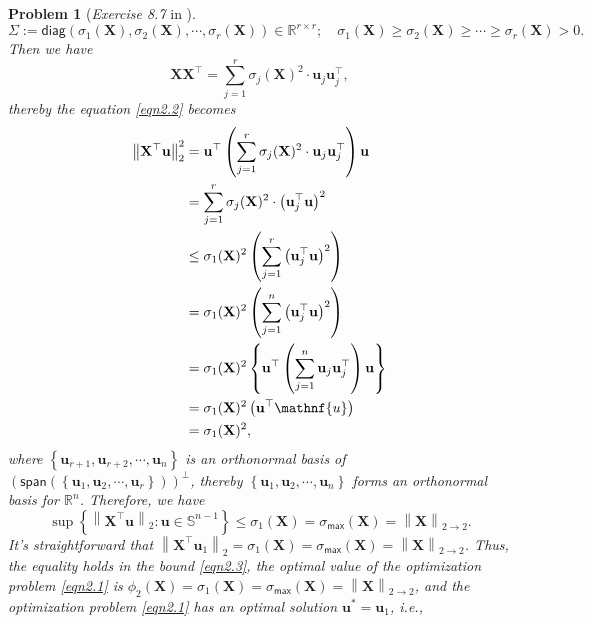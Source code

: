 \documentclass[11pt]{article}
\newtheorem{problem}{Problem}
\numberwithin{equation}{problem}
\begin{document}
\begin{problem} [\emph{Exercise 8.7} in \cite{calafiore2014optimization}]
{\begin{equation*}
    \Sigma := \textsf{diag} \left( \sigma_1 (\mathbf{X}), \sigma_2 (\mathbf{X}), \cdots, \sigma_r (\mathbf{X}) \right) \in \mathbb{R}^{r \times r}; \quad \sigma_1 (\mathbf{X}) \geq \sigma_2 (\mathbf{X}) \geq \cdots \geq \sigma_r (\mathbf{X}) > 0.
\end{equation*}
Then we have
\begin{equation*}
    \mathbf{X} \mathbf{X}^{\top} =
    \sum_{j=1}^{r} \sigma_j (\mathbf{X})^2 \cdot \mathbf{u}_j \mathbf{u}_{j}^{\top},
\end{equation*}
thereby the equation \eqref{eqn2.2} becomes
\begin{equation*}
    \begin{split}
        \left\| \mathbf{X}^{\top} \mathbf{u} \right\|_{2}^2 &= \mathbf{u}^{\top} \left( \sum_{j=1}^{r} \sigma_j (\mathbf{X})^2 \cdot \mathbf{u}_j \mathbf{u}_{j}^{\top} \right) \mathbf{u} \\
        &= \sum_{j=1}^{r} \sigma_j (\mathbf{X})^2 \cdot \left( \mathbf{u}_{j}^{\top} \mathbf{u} \right)^2 \\
        &\leq \sigma_{1}(\mathbf{X})^2 \left( \sum_{j=1}^{r} \left( \mathbf{u}_{j}^{\top} \mathbf{u} \right)^2 \right) \\
        &= \sigma_{1}(\mathbf{X})^2 \left( \sum_{j=1}^{n} \left( \mathbf{u}_{j}^{\top} \mathbf{u} \right)^2 \right) \\
        &= \sigma_{1}(\mathbf{X})^2 \left\{ \mathbf{u}^{\top} \left( \sum_{j=1}^{n} \mathbf{u}_j \mathbf{u}_{j}^{\top} \right) \mathbf{u} \right\} \\
        &= \sigma_{1}(\mathbf{X})^2 \left( \mathbf{u}^{\top} \mathnf{u} \right) \\
        &= \sigma_{1}(\mathbf{X})^2,
    \end{split}
\end{equation*}
where $\left\{ \mathbf{u}_{r+1}, \mathbf{u}_{r+2}, \cdots, \mathbf{u}_{n} \right\}$ is an orthonormal basis of $\left( \textsf{span} \left( \left\{ \mathbf{u}_1, \mathbf{u}_2, \cdots, \mathbf{u}_r \right\} \right) \right)^{\perp}$, thereby $\left\{ \mathbf{u}_1, \mathbf{u}_2, \cdots, \mathbf{u}_n \right\}$ forms an orthonormal basis for $\mathbb{R}^n$. Therefore, we have
\begin{equation}
    \label{eqn2.3}
    \sup \left\{ \left\| \mathbf{X}^{\top} \mathbf{u} \right\|_2 : \mathbf{u} \in \mathbb{S}^{n-1} \right\} \leq \sigma_1 (\mathbf{X}) = \sigma_{\textsf{max}}(\mathbf{X}) = \left\| \mathbf{X} \right\|_{2 \to 2}.
\end{equation}
It's straightforward that $\left\| \mathbf{X}^{\top} \mathbf{u}_1 \right\|_2 = \sigma_1 (\mathbf{X}) = \sigma_{\textsf{max}}(\mathbf{X}) = \left\| \mathbf{X} \right\|_{2 \to 2}$. Thus, the equality holds in the bound \eqref{eqn2.3}, the optimal value of the optimization problem \eqref{eqn2.1} is $\phi_2 (\mathbf{X}) = \sigma_1 (\mathbf{X}) = \sigma_{\textsf{max}}(\mathbf{X}) = \left\| \mathbf{X} \right\|_{2 \to 2}$, and the optimization problem \eqref{eqn2.1} has an optimal solution $\mathbf{u}^* = \mathbf{u}_1$, \emph{i.e.},
}
\end{problem}
\end{document}
